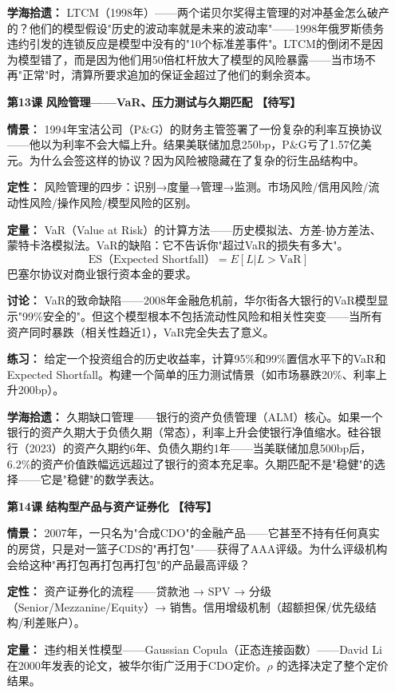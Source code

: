 \documentclass[a4paper,11pt]{ctexart}
\newcommand{\draft}{\textcolor{orange!80!black}{\textbf{【待写】}}}
\begin{document}
\begin{enumerate}
\textbf{学海拾遗：} LTCM（1998年）——两个诺贝尔奖得主管理的对冲基金怎么破产的？他们的模型假设"历史的波动率就是未来的波动率"——1998年俄罗斯债务违约引发的连锁反应是模型中没有的"10个标准差事件"。LTCM的倒闭不是因为模型错了，而是因为他们用50倍杠杆放大了模型的风险暴露——当市场不再"正常"时，清算所要求追加的保证金超过了他们的剩余资本。

\item[\textbf{第13课}] \textbf{风险管理——VaR、压力测试与久期匹配} \draft

\textbf{情景：} 1994年宝洁公司（P&G）的财务主管签署了一份复杂的利率互换协议——他以为利率不会大幅上升。结果美联储加息250bp，P&G亏了1.57亿美元。为什么会签这样的协议？因为风险被隐藏在了复杂的衍生品结构中。

\textbf{定性：} 风险管理的四步：识别→度量→管理→监测。市场风险/信用风险/流动性风险/操作风险/模型风险的区别。

\textbf{定量：} VaR（Value at Risk）的计算方法——历史模拟法、方差-协方差法、蒙特卡洛模拟法。VaR的缺陷：它不告诉你"超过VaR的损失有多大"。
\[
\text{ES（Expected Shortfall）} = E[L | L > \text{VaR}]
\]
巴塞尔协议对商业银行资本金的要求。

\textbf{讨论：} VaR的致命缺陷——2008年金融危机前，华尔街各大银行的VaR模型显示"99\%安全的"。但这个模型根本不包括流动性风险和相关性突变——当所有资产同时暴跌（相关性趋近1），VaR完全失去了意义。

\textbf{练习：} 给定一个投资组合的历史收益率，计算95\%和99\%置信水平下的VaR和Expected Shortfall。构建一个简单的压力测试情景（如市场暴跌20\%、利率上升200bp）。

\textbf{学海拾遗：} 久期缺口管理——银行的资产负债管理（ALM）核心。如果一个银行的资产久期大于负债久期（常态），利率上升会使银行净值缩水。硅谷银行（2023）的资产久期约6年、负债久期约1年——当美联储加息500bp后，6.2\%的资产价值跌幅远远超过了银行的资本充足率。久期匹配不是"稳健"的选择——它是"稳健"的数学表达。

\item[\textbf{第14课}] \textbf{结构型产品与资产证券化} \draft

\textbf{情景：} 2007年，一只名为"合成CDO"的金融产品——它甚至不持有任何真实的房贷，只是对一篮子CDS的"再打包"——获得了AAA评级。为什么评级机构会给这种"再打包再打包再打包"的产品最高评级？

\textbf{定性：} 资产证券化的流程——贷款池 → SPV → 分级（Senior/Mezzanine/Equity）→ 销售。信用增级机制（超额担保/优先级结构/利差账户）。

\textbf{定量：} 违约相关性模型——Gaussian Copula（正态连接函数）——David Li在2000年发表的论文，被华尔街广泛用于CDO定价。$ \rho $ 的选择决定了整个定价结果。


\end{enumerate}
\end{document}
